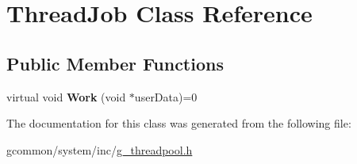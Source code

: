 \hypertarget{class_thread_job}{\section{Thread\-Job Class Reference}
\label{class_thread_job}
}
\subsection*{Public Member Functions}
\begin{DoxyCompactItemize}
\item 
\hypertarget{class_thread_job_a1f548013ff819b38fea97f9d752bf4a6}{virtual void {\bfseries Work} (void $\ast$user\-Data)=0}\label{class_thread_job_a1f548013ff819b38fea97f9d752bf4a6}

\end{DoxyCompactItemize}


The documentation for this class was generated from the following file\-:\begin{DoxyCompactItemize}
\item 
gcommon/system/inc/\hyperlink{g__threadpool_8h}{g\-\_\-threadpool.\-h}\end{DoxyCompactItemize}

